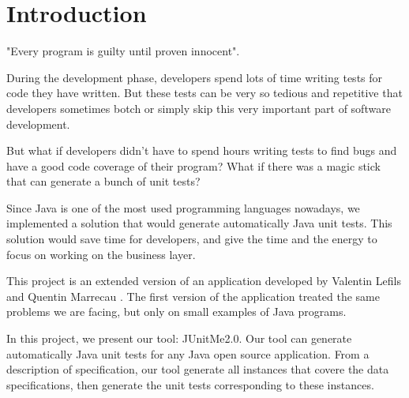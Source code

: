 \chapter*{Introduction}
	\thispagestyle{introduction}
	"Every program is guilty until proven innocent".
	
	During the development phase, developers spend lots of time writing tests for code they have written. But these tests can be very so tedious and repetitive that developers sometimes botch or simply skip this very important part of software development.
	
	But what if developers didn't have to spend hours writing tests to find bugs and have a good code coverage of their program? What if there was a magic stick that can generate a bunch of unit tests? 
	
Since Java is one of the most used programming languages nowadays, we implemented a solution that would generate automatically Java unit tests. This solution would save time for developers, and give the time and the energy to focus on working on the business layer.

This project is an extended version of an application developed by Valentin Lefils and Quentin Marrecau \cite{JUnitMeRapport} \cite{JUnitMeGitHub} . The first version of the application treated the same problems we are facing, but only on small examples of Java programs.

In this project, we present our tool: JUnitMe2.0. Our tool can generate automatically Java unit tests for any Java open source application. From a description of specification, our tool generate all instances that covere the data specifications, then generate the unit tests corresponding to these instances.